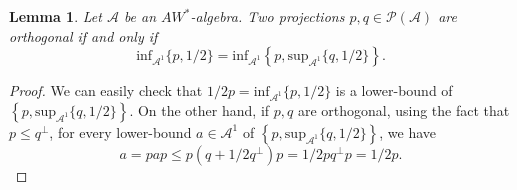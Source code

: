 \documentclass[12pt]{amsart}
\newtheorem{lem}[thm]{Lemma}
\theoremstyle{definition}
\theoremstyle{remark}
\numberwithin{equation}{section}
\begin{document}
\begin{lem}\label{orth}
Let $\mathcal{A}$ be an $AW^*$-algebra.  Two projections $p,q\in\mathcal{P(A)}$    are orthogonal if and only if
$$\mathrm{inf}_{\mathcal{A}^1}\{p,1/2\}=\mathrm{inf}_{\mathcal{A}^1}\left\lbrace p, \mathrm{sup}_{\mathcal{A}^1}\{q, 1/2\}\right\rbrace.$$ 

\end{lem}
\begin{proof}
We can easily check that $1/2p=\mathrm{inf}_{\mathcal{A}^1}\{p,1/2\}$ is a lower-bound of $\left\lbrace p, \mathrm{sup}_{\mathcal{A}^1}\{q, 1/2\}\right\rbrace$. On the other hand, if $p,q$ are orthogonal, using the fact that $p\leq q^{\perp}$, for every lower-bound $a\in\mathcal{A}^1$  of $\left\lbrace p, \mathrm{sup}_{\mathcal{A}^1}\{q, 1/2\}\right\rbrace$, we have  $$a=pap\leq p(q+1/2q^{\perp})p= 1/2pq^\perp p=1/2p.$$


\end{proof}
\end{document}
